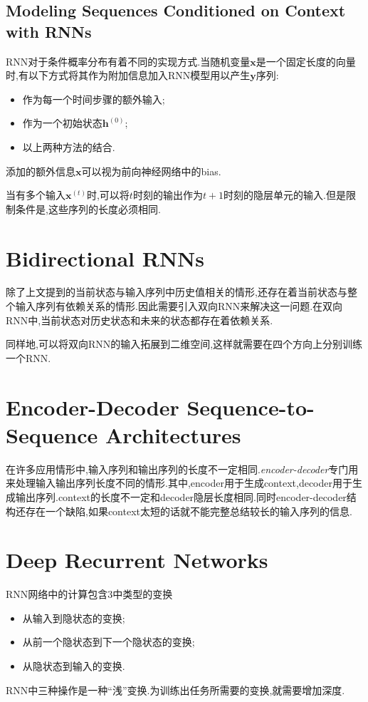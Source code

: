 \subsection{Modeling Sequences Conditioned on Context with RNNs}

RNN对于条件概率分布有着不同的实现方式.当随机变量$\bm x$是一个固定长度的向量时,有以下方式将其作为附加信息加入RNN模型用以产生$\bm y$序列:
\begin{itemize}
    \item 作为每一个时间步骤的额外输入;
    \item 作为一个初始状态$\bm h^{(0)}$;
    \item 以上两种方法的结合.
\end{itemize}
添加的额外信息$\bm x$可以视为前向神经网络中的bias.

当有多个输入$\bm x^{(t)}$时,可以将$t$时刻的输出作为$t+1$时刻的隐层单元的输入.但是限制条件是,这些序列的长度必须相同.

\section{Bidirectional RNNs}

除了上文提到的当前状态与输入序列中历史值相关的情形,还存在着当前状态与整个输入序列有依赖关系的情形.因此需要引入双向RNN来解决这一问题.在双向RNN中,当前状态对历史状态和未来的状态都存在着依赖关系.

同样地,可以将双向RNN的输入拓展到二维空间,这样就需要在四个方向上分别训练一个RNN.

\section{Encoder-Decoder Sequence-to-Sequence Architectures}

在许多应用情形中,输入序列和输出序列的长度不一定相同.\textit{encoder-decoder}专门用来处理输入输出序列长度不同的情形.其中,encoder用于生成context,decoder用于生成输出序列.context的长度不一定和decoder隐层长度相同.同时encoder-decoder结构还存在一个缺陷,如果context太短的话就不能完整总结较长的输入序列的信息.

\section{Deep Recurrent Networks}

RNN网络中的计算包含3中类型的变换
\begin{itemize}
    \item 从输入到隐状态的变换;
    \item 从前一个隐状态到下一个隐状态的变换;
    \item 从隐状态到输入的变换.
\end{itemize}
RNN中三种操作是一种``浅''变换.为训练出任务所需要的变换,就需要增加深度.

